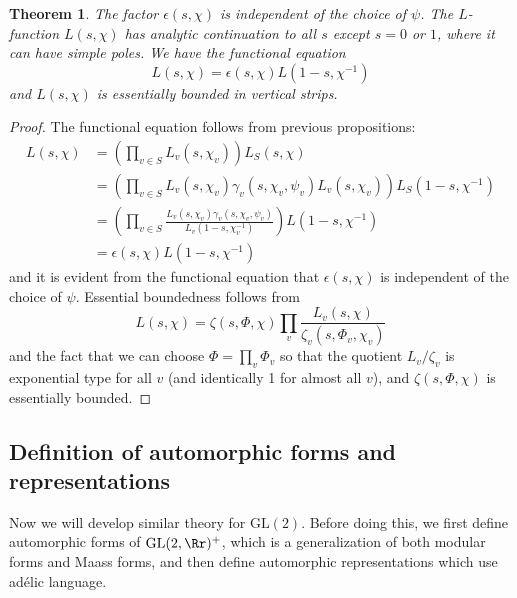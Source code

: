 \documentclass{article}
\newtheorem{theorem}{Theorem}[section]
\newcommand{\GL}{\mathrm{GL}}
\begin{document}
\begin{theorem}
The factor $\epsilon(s, \chi)$ is independent of the choice of $\psi$. 
The $L$-function $L(s, \chi)$ has analytic continuation to all $s$ except $s = 0$ or $1$, where it can have simple poles. We have the functional equation 
$$
L(s, \chi) = \epsilon(s, \chi) L(1-s, \chi^{-1})
$$
and $L(s, \chi)$ is essentially bounded in vertical strips. 
\end{theorem}
\begin{proof}
The functional equation follows from previous propositions:
\begin{align*}
L(s, \chi) &=\left( \prod_{v\in S}L_{v}(s, \chi_{v})\right) L_{S}(s, \chi) \\
&= \left(\prod_{v\in S} L_{v}(s, \chi_{v}) \gamma_{v}(s, \chi_{v}, \psi_{v}) L_{v}(s, \chi_{v})\right) L_{S}(1-s, \chi^{-1}) \\
&= \left( \prod_{v\in S} \frac{L_{v}(s, \chi_{v}) \gamma_{v}(s, \chi_{v}, \psi_{v})}{L_{v}(1-s, \chi_{v}^{-1})}\right) L(1-s, \chi^{-1}) \\
&= \epsilon(s, \chi) L(1-s, \chi^{-1})
\end{align*}
and it is evident from the functional equation that $\epsilon(s, \chi)$ is independent of the choice of $\psi$. Essential boundedness follows from 
$$
L(s, \chi) = \zeta(s, \Phi, \chi) \prod_{v} \frac{L_{v}(s, \chi)}{\zeta_{v}(s, \Phi_{v}, \chi_{v})}
$$
and the fact that we can choose $\Phi = \prod_{v}\Phi_{v}$ so that the quotient $L_{v} / \zeta_{v}$ is exponential type for all $v$ (and identically 1 for almost all $v$), and $\zeta(s, \Phi, \chi)$ is essentially bounded. 
\end{proof}


















\subsection{Definition of automorphic forms and representations}

Now we will develop similar theory for $\GL(2)$. Before doing this, we first define automorphic forms of $\GL(2, \Rr)^{+}$, which is a generalization of both modular forms and Maass forms, and then define automorphic representations which use ad\'elic language. 
\end{document}
